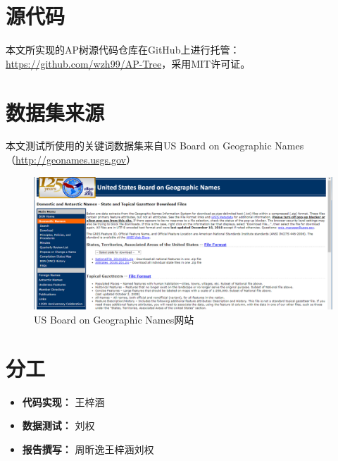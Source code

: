 \documentclass[UTF8]{ctexart}
\begin{document}
\begin{appendices}

\section{源代码}
本文所实现的AP树源代码仓库在GitHub上进行托管：\url{https://github.com/wzh99/AP-Tree}，采用MIT许可证。

\section{数据集来源}
本文测试所使用的关键词数据集来自US Board on Geographic Names（\url{http://geonames.usgs.gov}）

\begin{figure}[htbp]
    \centering
    \includegraphics[width=\textwidth]{gn.png}
    \caption{US Board on Geographic Names网站}
\end{figure}

\section{分工}
\begin{itemize}
    \item \textbf{代码实现：} 王梓涵
    \item \textbf{数据测试：} 刘权
    \item \textbf{报告撰写：} 周昕逸\quad 王梓涵\quad 刘权
\end{itemize}

\end{appendices}
\end{document}
